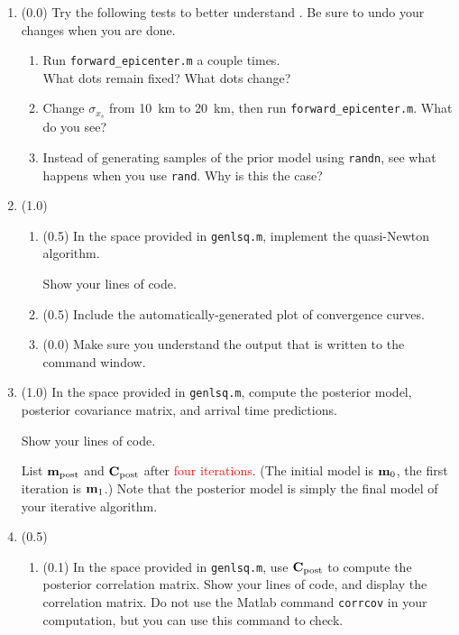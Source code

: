 \documentclass[11pt,titlepage,fleqn]{article}
\begin{document}
\begin{enumerate}

\item (0.0) Try the following tests to better understand . Be sure to undo your changes when you are done.
%
\begin{enumerate}
\item Run \verb+forward_epicenter.m+ a couple times. \\
What dots remain fixed? What dots change?

\item Change $\sigma_{x_s}$ from 10~km to 20~km, then run \verb+forward_epicenter.m+. What do you see?

\item Instead of generating samples of the prior model using \verb+randn+, see what happens when you use \verb+rand+. Why is this the case?
\end{enumerate}

\item (1.0)
%
\begin{enumerate}
\item (0.5) In the space provided in \verb+genlsq.m+, implement the quasi-Newton algorithm.

Show your lines of code.

\item (0.5) Include the automatically-generated plot of convergence curves.

\item (0.0) Make sure you understand the output that is written to the command window.
\end{enumerate}


\item (1.0) In the space provided in \verb+genlsq.m+, compute the posterior model, posterior covariance matrix, and arrival time predictions.

Show your lines of code.

List $\mbox{${\bf m}$}_{\rm post}$ and $\mbox{${\bf C}$}_{\rm post}$ after \textcolor{red}{four iterations}. (The initial model is $\mbox{${\bf m}$}_0$, the first iteration is $\mbox{${\bf m}$}_1$.) Note that the posterior model is simply the final model of your iterative algorithm.


\item (0.5) 
\begin{enumerate}
\item (0.1) In the space provided in \verb+genlsq.m+, use $\mbox{${\bf C}$}_{\rm post}$ to compute the posterior correlation matrix. Show your lines of code, and display the correlation matrix. Do not use the Matlab command \verb+corrcov+ in your computation, but you can use this command to check.


\end{enumerate}
\end{enumerate}
\end{document}
